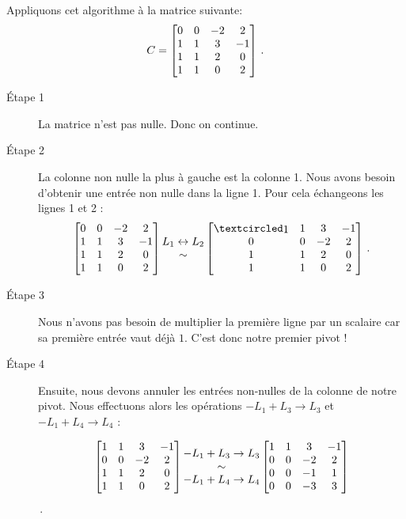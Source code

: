 \begin{myexample} 

Appliquons cet algorithme \`a la matrice suivante:  $$C=
\left[ \begin{matrix} 0 & 0 & -2 & 2 \\
 1 & 1 & 3 & -1 \\
 1 & 1 & 2 & 0 \\
 1 & 1 & 0 & 2 \end{matrix} \right]\,.$$

\begin{description}
\item[Étape 1] La matrice n'est pas nulle. Donc on continue.
\item[Étape 2] La colonne non nulle la plus à gauche est la colonne 1. Nous avons besoin d'obtenir une entrée non nulle dans la ligne 1. Pour cela échangeons les lignes 1 et 2 :
$$\mat{0 & 0 & -2 & 2 \\
 1 & 1 & 3 & -1 \\
 1 & 1 & 2 & 0 \\
 1 & 1 & 0 & 2} 
\begin{matrix} L_1\leftrightarrow L_2\\ \sim  \end{matrix} 
\mat{ \pivot & 1 & 3 & -1\\ 
0 & 0 & -2 & 2 \\
 1 & 1 & 2 & 0 \\
 1 & 1 & 0 & 2}\,.$$
\item[Étape 3] Nous n'avons pas besoin de multiplier la première ligne par un scalaire car sa première entr\'ee vaut déjà $1$. C'est donc notre premier pivot !
\item[Étape 4] Ensuite, nous devons annuler les entr\'ees non-nulles de la colonne de notre pivot. Nous effectuons alors les op\'erations $-L_1+L_3\to L_3$ et $-L_1+L_4\to L_4 $ :

$$\left[ \begin{matrix}  1 & 1 & 3 & -1\\ 
0 & 0 & -2 & 2 \\
 1 & 1 & 2 & 0 \\
 1 & 1 & 0 & 2 \end{matrix} \right]
\begin{matrix} -L_1+L_3\to L_3 \\ \sim \\-L_1+L_4\to L_4 \end{matrix} 
\left[ \begin{matrix}  
1 & 1 & 3 & -1\\ 
0 & 0 & -2 & 2 \\
0 & 0 & -1 & 1 \\
0 & 0 & -3 & 3 \end{matrix} \right]$$\,.


\end{description}
\end{myexample}
